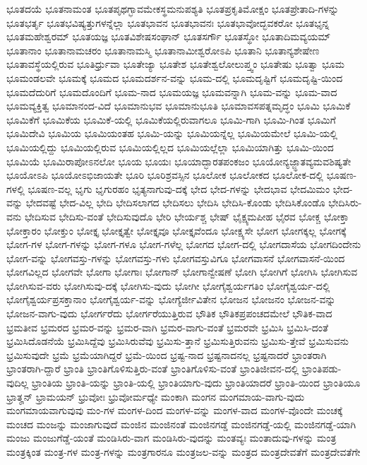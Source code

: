 {ಭೂತದಯೆ
ಭೂತನಾಮಂತ
ಭೂತಪೃಥಗ್ಭಾವಮೇಕಸ್ಥಮನುಪಶ್ಯತಿ
ಭೂತಪ್ರಕೃತಿಮೋಕ್ಷಂ
ಭೂತಪ್ರೇತಾದಿ-ಗಳನ್ನು
ಭೂತಭರ್ತೃ
ಭೂತಭವಿಷ್ಯತ್ತುಗಳನ್ನೆಲ್ಲಾ
ಭೂತಭಾವನ
ಭೂತಭಾವನಃ
ಭೂತಭಾವೋದ್ಭವಕರೋ
ಭೂತಭೃನ್ನ
ಭೂತಮಹೇಶ್ವರಮ್
ಭೂತಯಜ್ಞ
ಭೂತವಿಶೇಷಸಂಘಾನ್
ಭೂತಸರ್ಗೌ
ಭೂತಸ್ಥೋ
ಭೂತಾದಿಮವ್ಯಯಮ್
ಭೂತಾನಾಂ
ಭೂತಾನಾಮಚರಂ
ಭೂತಾನಾಮಸ್ಮಿ
ಭೂತಾನಾಮೀಶ್ವರೋಽಪಿ
ಭೂತಾನಿ
ಭೂತಾನ್ಯಶೇಷೇಣ
ಭೂತಾವಸ್ಥೆಯಲ್ಲಿರುವ
ಭೂತಿರ್ಧ್ರುವಾ
ಭೂತೇಜ್ಯಾ
ಭೂತೇಶ
ಭೂತೇಶ್ವಲೋಲುಪ್ತ್ವಂ
ಭೂತೇಷು
ಭೂತ್ವಾ
ಭೂಮ
ಭೂಮಂಡಲವೇ
ಭೂಮಕ್ಕೆ
ಭೂಮದ
ಭೂಮದರ್ಶನ-ವನ್ನು
ಭೂಮ-ದಲ್ಲಿ
ಭೂಮದೃಷ್ಟಿಗೆ
ಭೂಮದೃಷ್ಟಿ-ಯಿಂದ
ಭೂಮದೆದುರಿಗೆ
ಭೂಮದೊಂದಿಗೆ
ಭೂಮ-ನಾದ
ಭೂಮಯಜ್ಞ
ಭೂಮವನ್ನಾಗಿ
ಭೂಮ-ವನ್ನು
ಭೂಮ-ವಾದ
ಭೂಮವ್ಯಕ್ತಿತ್ವ
ಭೂಮಾನಂದ-ವಿದೆ
ಭೂಮಾನುಭವ
ಭೂಮಾನುಭೂತಿ
ಭೂಮಾವಸಪತ್ನಮೃದ್ಧಂ
ಭೂಮಿ
ಭೂಮಿಕೆ
ಭೂಮಿಕೆಗೆ
ಭೂಮಿಕೆಯ
ಭೂಮಿಕೆ-ಯಲ್ಲಿ
ಭೂಮಿಕೆಯಲ್ಲಿರುವಾಗಲೂ
ಭೂಮಿ-ಗಾಗಿ
ಭೂಮಿ-ಗಿಂತ
ಭೂಮಿಗೆ
ಭೂಮಿದೇವಿ
ಭೂಮಿಯ
ಭೂಮಿಯಂತಹ
ಭೂಮಿ-ಯನ್ನು
ಭೂಮಿಯನ್ನೆಲ್ಲ
ಭೂಮಿಯಮೇಲೆ
ಭೂಮಿ-ಯಲ್ಲಿ
ಭೂಮಿಯಲ್ಲಿದ್ದು
ಭೂಮಿಯಲ್ಲಿರುವ
ಭೂಮಿಯಲ್ಲಿಲ್ಲದ
ಭೂಮಿಯಲ್ಲೆಲ್ಲಾ
ಭೂಮಿಯಾಗಿತ್ತು
ಭೂಮಿ-ಯಿಂದ
ಭೂಮಿಯೆ
ಭೂಮಿರಾಪೋಽನಲೋ
ಭೂಯ
ಭೂಯಃ
ಭೂಯಾದ್ಭಾರತಪಂಕಜಂ
ಭೂಯೋನ್ಯಜ್ಜ್ಞಾತವ್ಯಮವಶಿಷ್ಯತೇ
ಭೂಯೋಽಪಿ
ಭೂಯೋಽಭಿಜಾಯತೇ
ಭೂರಿ
ಭೂರಿಶ್ರವಸ್ಸಿನ
ಭೂಲೋಕ
ಭೂಲೋಕದ
ಭೂಲೋಕ-ದಲ್ಲಿ
ಭೂಷಣ-ಗಳಲ್ಲಿ
ಭೂಷಣ-ವಲ್ಲ
ಭೃಗು
ಭೃಗುರಹಂ
ಭೃತ್ಯನಾಗುವು-ದಕ್ಕೆ
ಭೇದ
ಭೇದ-ಗಳನ್ನು
ಭೇದಭಾವ
ಭೇದಮಿಮಂ
ಭೇದ-ವನ್ನು
ಭೇದವಷ್ಟೆ
ಭೇದ-ವಿಲ್ಲ
ಭೇದಿ
ಭೇದಿಸಲಾಗದ
ಭೇದಿಸಲು
ಭೇದಿಸಿ
ಭೇದಿಸಿ-ಕೊಂಡು
ಭೇದಿಸಿಕೊಂಡೊ
ಭೇದಿಸಿರು-ವನು
ಭೇದಿಸುವ
ಭೇದಿಸು-ವಂತೆ
ಭೇದಿಸುವುದೊ
ಭೇರಿ
ಭೇರ್ಯಶ್ಚ
ಭೇಷ್
ಭೈಕ್ಷ್ಯಮಪೀಹ
ಭೈರವ
ಭೋಕ್ಚ
ಭೋಕ್ತಾ
ಭೋಕ್ತಾರಂ
ಭೋಕ್ತುಂ
ಭೋಕ್ತೃ
ಭೋಕ್ತೃತ್ವೇ
ಭೋಕ್ತೃವೂ
ಭೋಕ್ತೃವೆಂದೂ
ಭೋಕ್ಷ್ಯಸೇ
ಭೋಗ
ಭೋಗಕ್ಕಲ್ಲ
ಭೋಗಕ್ಕೆ
ಭೋಗ-ಗಳ
ಭೋಗ-ಗಳನ್ನು
ಭೋಗ-ಗಳೂ
ಭೋಗ-ಗಳೆಲ್ಲ
ಭೋಗದ
ಭೋಗ-ದಲ್ಲಿ
ಭೋಗದಾಸೆಯ
ಭೋಗದಿಂದೇನು
ಭೋಗ-ವನ್ನು
ಭೋಗವಸ್ತು-ಗಳನ್ನು
ಭೋಗವಸ್ತು-ಗಳು
ಭೋಗವಸ್ತುವಿಗೂ
ಭೋಗವಾಸನೆ
ಭೋಗವಾಸನೆ-ಯಿಂದ
ಭೋಗವಿಲ್ಲದ
ಭೋಗವೇ
ಭೋಗಾ
ಭೋಗಾಃ
ಭೋಗಾನ್
ಭೋಗಾನ್ವೇಷಣೆ
ಭೋಗಿ
ಭೋಗಿಗೆ
ಭೋಗಿಸಿ
ಭೋಗಿಸುವ
ಭೋಗಿಸುವ-ವರು
ಭೋಗಿಸುವು-ದಕ್ಕೆ
ಭೋಗಿಸು-ವುದು
ಭೋಗೀ
ಭೋಗೈಶ್ವರ್ಯಗತಿಂ
ಭೋಗೈಶ್ವರ್ಯ-ದಲ್ಲಿ
ಭೋಗೈಶ್ವರ್ಯಪ್ರಸಕ್ತಾನಾಂ
ಭೋಗೈಶ್ವರ್ಯ-ವನ್ನು
ಭೋಗ್ಯೆರ್ಜೀವಿತೇನ
ಭೋಜನ
ಭೋಜನಂ
ಭೋಜನ-ವನ್ನು
ಭೋಜನ-ವಾಗು-ವುದು
ಭೋರ್ಗರೆದು
ಭೋರ್ಗರೆಯುತ್ತಿರುವ
ಭೌತಿಕ
ಭೌತಿಕಪ್ರಪಂಚದಮೇಲೆ
ಭೌತಿಕ-ವಾದ
ಭ್ರಮತೀವ
ಭ್ರಮರದ
ಭ್ರಮರ-ವನ್ನು
ಭ್ರಮರ-ವಾಗಿ
ಭ್ರಮರ-ವಾಗು-ವಂತೆ
ಭ್ರಮರವೇ
ಭ್ರಮಿಸಿ
ಭ್ರಮಿಸಿ-ದಂತೆ
ಭ್ರಮಿಸಿದೊಡನೆಯೆ
ಭ್ರಮಿಸಿದ್ದೆವು
ಭ್ರಮಿಸಿರುವೆವು
ಭ್ರಮಿಸು-ತ್ತಾನೆ
ಭ್ರಮಿಸುತ್ತಿರುವನು
ಭ್ರಮಿಸು-ತ್ತೇವೆ
ಭ್ರಮಿಸುವನು
ಭ್ರಮಿಸುವುದೇ
ಭ್ರಮೆ
ಭ್ರಮೆಯಾಗಿದ್ದರೆ
ಭ್ರಮೆ-ಯಿಂದ
ಭ್ರಷ್ಟ-ನಾದ
ಭ್ರಷ್ಟನಾದನಲ್ಲ
ಭ್ರಷ್ಟನಾದರೆ
ಭ್ರಾಂತರಾಗಿ
ಭ್ರಾಂತರಾಗಿ-ದ್ದಾರೆ
ಭ್ರಾಂತಿ
ಭ್ರಾಂತಿಗೊಳಿಸುತ್ತಿರು-ವಂತೆ
ಭ್ರಾಂತಿಗೊಳಿಸು-ವಂತೆ
ಭ್ರಾಂತಿಜೀವನ-ದಲ್ಲಿ
ಭ್ರಾಂತಿಪಡು-ವುದಿಲ್ಲ
ಭ್ರಾಂತಿಯ
ಭ್ರಾಂತಿ-ಯನ್ನು
ಭ್ರಾಂತಿ-ಯಲ್ಲಿ
ಭ್ರಾಂತಿಯಾಗು-ವುದು
ಭ್ರಾಂತಿಯಾದರೆ
ಭ್ರಾಂತಿ-ಯಿಂದ
ಭ್ರಾಂತಿಯೂ
ಭ್ರಾತೄನ್
ಭ್ರಾಮಯನ್
ಭ್ರುವೋಃ
ಭ್ರುವೋರ್ಮಧ್ಯೇ
ಮಂಕಾಗಿ
ಮಂಗನ
ಮಂಗಮಾಯ-ವಾಗು-ವುದು
ಮಂಗಮಾಯವಾಗುವುವು
ಮಂ-ಗಳ
ಮಂಗಳ-ದಿಂದ
ಮಂಗಳ-ವನ್ನು
ಮಂಗಳ-ವಾದ
ಮಂಗಳ-ವೊಂದೇ
ಮಂಚಕ್ಕೆ
ಮಂಚದ
ಮಂಜನ್ನು
ಮಂಜಾಗುವುದೆ
ಮಂಜಿನ
ಮಂಜಿನಂತೆ
ಮಂಜಿನಗಡ್ಡೆ
ಮಂಜಿನಗಡ್ಡೆ-ಯಲ್ಲಿ
ಮಂಜಿನಗಡ್ಡೆ-ಯಾಗಿ
ಮಂಜು
ಮಂಜುಗೆಡ್ಡೆ-ಯಂತೆ
ಮಂಡಿಸಿರು-ವಾಗ
ಮಂಡಿಸಿರು-ವುದನ್ನು
ಮಂತವ್ಯಃ
ಮಂತಾದುವು-ಗಳನ್ನು
ಮಂತ್ರ
ಮಂತ್ರಕ್ಕಿಂತ
ಮಂತ್ರ-ಗಳ
ಮಂತ್ರ-ಗಳನ್ನು
ಮಂತ್ರಗಾರನೂ
ಮಂತ್ರಜಲ-ವನ್ನು
ಮಂತ್ರದ
ಮಂತ್ರದೇವತೆಗೆ
ಮಂತ್ರದೇವತೆಗೇ
}
